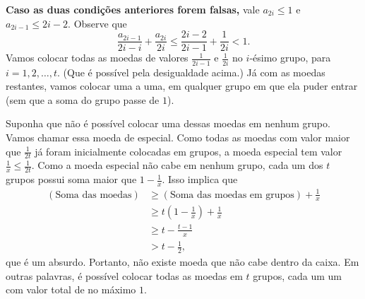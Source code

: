 \documentclass[10pt, a4paper]{article}
\begin{document}

	{\bfseries Caso as duas condições anteriores forem falsas,} vale $a_{2i} \le 1$ e $a_{2i-1} \le 2i - 2$. Observe que \[\frac{a_{2i-1}}{2i-i} + \frac{a_{2i}}{2i} \le \frac{2i-2}{2i-1} + \frac{1}{2i} < 1.\]
	Vamos colocar todas as moedas de valores $\frac{1}{2i - 1}$ e $\frac{1}{2i}$ no $i$-ésimo grupo, para $i = 1, 2, \dots, t$. (Que é possível pela desigualdade acima.)
	Já com as moedas restantes, vamos colocar uma a uma, em qualquer grupo em que ela puder entrar (sem que a soma do grupo passe de $1$).
	
	Suponha que não é possível colocar uma dessas moedas em nenhum grupo. Vamos chamar essa moeda de especial. Como todas as moedas com valor maior que $\frac{1}{2t}$ já foram inicialmente colocadas em grupos, a moeda especial tem valor $\frac{1}{x} \le \frac{1}{2t}$. Como a moeda especial não cabe em nenhum grupo, cada um dos $t$ grupos possui soma maior que $1 - \frac{1}{x}$. Isso implica que
	\begin{align*}
		(\text{Soma das moedas}) & \ge (\text{Soma das moedas em grupos}) + \frac{1}{x}\\
										 & \ge t\left(1 - \frac1x\right) + \frac{1}{x}\\
										 & \ge t - \frac{t-1}{x}\\
										 & > t - \frac{1}{2},
	\end{align*}
	que é um absurdo. Portanto, não existe moeda que não cabe dentro da caixa. Em outras palavras, é possível colocar todas as moedas em $t$ grupos, cada um um com valor total de no máximo $1$.
	
\end{document}
